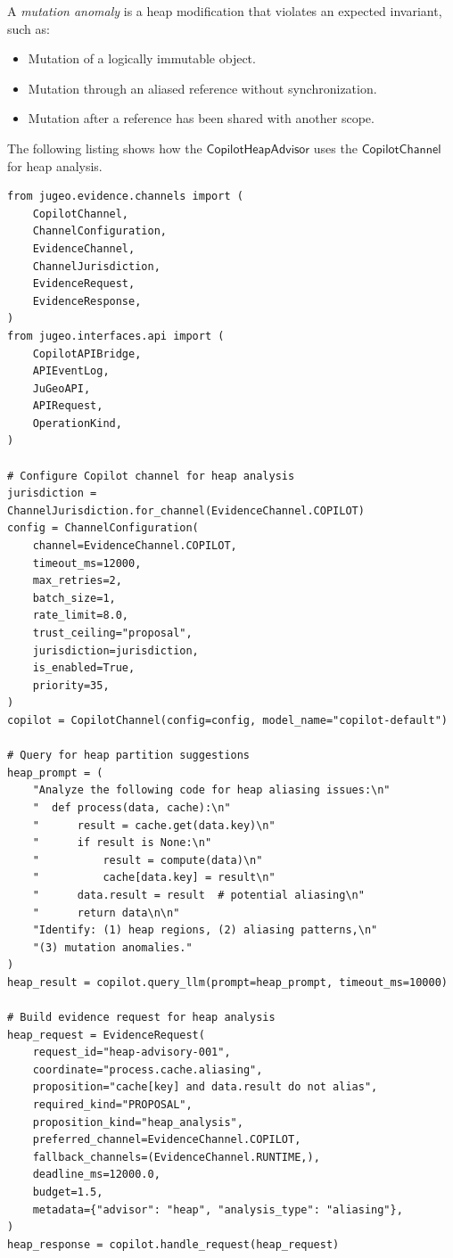 \documentclass[11pt]{article}
\newcommand{\HeapAdv}{\mathsf{CopilotHeapAdvisor}}
\newcommand{\CopChan}{\mathsf{CopilotChannel}}
\begin{document}
\begin{definition}
\label{def:mutation}
A \emph{mutation anomaly} is a heap modification that violates
an expected invariant, such as:
\begin{itemize}[leftmargin=2em]
\item Mutation of a logically immutable object.
\item Mutation through an aliased reference without synchronization.
\item Mutation after a reference has been shared with another scope.
\end{itemize}
\end{definition}

The following listing shows how the $\HeapAdv$ uses the
$\CopChan$ for heap analysis.

\begin{lstlisting}[style=jugeo-python, caption={CopilotChannel for heap analysis advisory.}, label=lst:heap-query]
from jugeo.evidence.channels import (
    CopilotChannel,
    ChannelConfiguration,
    EvidenceChannel,
    ChannelJurisdiction,
    EvidenceRequest,
    EvidenceResponse,
)
from jugeo.interfaces.api import (
    CopilotAPIBridge,
    APIEventLog,
    JuGeoAPI,
    APIRequest,
    OperationKind,
)

# Configure Copilot channel for heap analysis
jurisdiction = ChannelJurisdiction.for_channel(EvidenceChannel.COPILOT)
config = ChannelConfiguration(
    channel=EvidenceChannel.COPILOT,
    timeout_ms=12000,
    max_retries=2,
    batch_size=1,
    rate_limit=8.0,
    trust_ceiling="proposal",
    jurisdiction=jurisdiction,
    is_enabled=True,
    priority=35,
)
copilot = CopilotChannel(config=config, model_name="copilot-default")

# Query for heap partition suggestions
heap_prompt = (
    "Analyze the following code for heap aliasing issues:\n"
    "  def process(data, cache):\n"
    "      result = cache.get(data.key)\n"
    "      if result is None:\n"
    "          result = compute(data)\n"
    "          cache[data.key] = result\n"
    "      data.result = result  # potential aliasing\n"
    "      return data\n\n"
    "Identify: (1) heap regions, (2) aliasing patterns,\n"
    "(3) mutation anomalies."
)
heap_result = copilot.query_llm(prompt=heap_prompt, timeout_ms=10000)

# Build evidence request for heap analysis
heap_request = EvidenceRequest(
    request_id="heap-advisory-001",
    coordinate="process.cache.aliasing",
    proposition="cache[key] and data.result do not alias",
    required_kind="PROPOSAL",
    proposition_kind="heap_analysis",
    preferred_channel=EvidenceChannel.COPILOT,
    fallback_channels=(EvidenceChannel.RUNTIME,),
    deadline_ms=12000.0,
    budget=1.5,
    metadata={"advisor": "heap", "analysis_type": "aliasing"},
)
heap_response = copilot.handle_request(heap_request)


\end{lstlisting}
\end{document}
